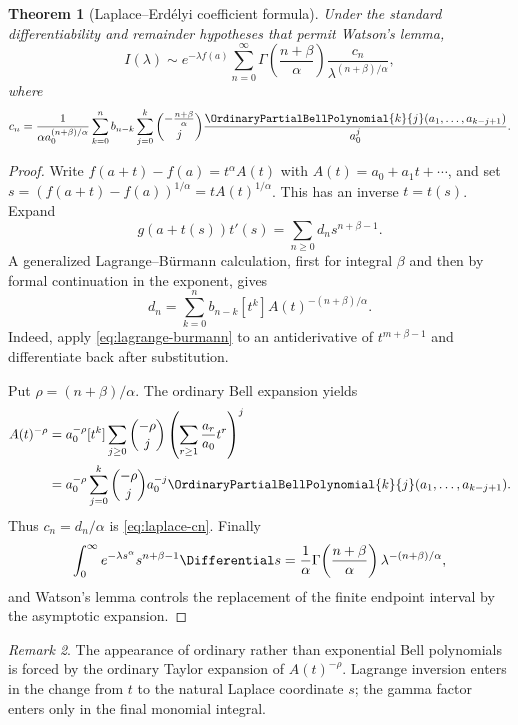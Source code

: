 \documentclass[11pt,a4paper,oneside,openany]{book}
\newtheorem{theorem}{Theorem}[chapter]
\theoremstyle{definition}
\theoremstyle{remark}
\newtheorem{remark}[theorem]{Remark}
\begin{document}
\begin{theorem}[Laplace--Erd\'elyi coefficient formula]
\label{thm:laplace-bell}
Under the standard differentiability and remainder hypotheses that permit Watson's
lemma,
\begin{equation}\label{eq:laplace-asymptotic}
 I(\lambda)\sim e^{-\lambda f(a)}
 \sum_{n=0}^{\infty}
 \Gamma\!\left(\frac{n+\beta}{\alpha}\right)
 \frac{c_n}{\lambda^{(n+\beta)/\alpha}},
\end{equation}
where
\begin{equation}\label{eq:laplace-cn}
 c_n=\frac1{\alpha a_0^{(n+\beta)/\alpha}}
 \sum_{k=0}^{n}b_{n-k}
 \sum_{j=0}^{k}
 \binom{-\frac{n+\beta}{\alpha}}{j}
 \frac{\OrdinaryPartialBellPolynomial{k}{j}(a_1,\ldots,a_{k-j+1})}{a_0^j}.
\end{equation}
\end{theorem}
\begin{proof}
Write
$f(a+t)-f(a)=t^\alpha A(t)$ with
$A(t)=a_0+a_1t+\cdots$, and set
$s=(f(a+t)-f(a))^{1/\alpha}=tA(t)^{1/\alpha}$.  This has an inverse $t=t(s)$.
Expand
\[
 g(a+t(s))t'(s)=\sum_{n\ge0}d_ns^{n+\beta-1}.
\]
A generalized Lagrange--Bürmann calculation, first for integral $\beta$ and then
by formal continuation in the exponent, gives
\[
 d_n=\sum_{k=0}^{n}b_{n-k}[t^k]A(t)^{-(n+\beta)/\alpha}.
\]
Indeed, apply \eqref{eq:lagrange-burmann} to an antiderivative of
$t^{m+\beta-1}$ and differentiate back after substitution.

Put $\rho=(n+\beta)/\alpha$.  The ordinary Bell expansion yields
\begin{align*}
 [t^k]A(t)^{-\rho}
 &=a_0^{-\rho}[t^k]
 \sum_{j\ge0}\binom{-\rho}{j}
 \left(\sum_{r\ge1}\frac{a_r}{a_0}t^r\right)^j\\
 &=a_0^{-\rho}\sum_{j=0}^{k}\binom{-\rho}{j}a_0^{-j}
 \OrdinaryPartialBellPolynomial{k}{j}(a_1,\ldots,a_{k-j+1}).
\end{align*}
Thus $c_n=d_n/\alpha$ is \eqref{eq:laplace-cn}.  Finally
\[
 \int_0^\infty e^{-\lambda s^\alpha}s^{n+\beta-1}\Differential s
 =\frac1\alpha\Gamma\!\left(\frac{n+\beta}{\alpha}\right)
 \lambda^{-(n+\beta)/\alpha},
\]
and Watson's lemma controls the replacement of the finite endpoint interval by
the asymptotic expansion.
\end{proof}

\begin{remark}
The appearance of ordinary rather than exponential Bell polynomials is forced by
the ordinary Taylor expansion of $A(t)^{-\rho}$.  Lagrange inversion enters in the
change from $t$ to the natural Laplace coordinate $s$; the gamma factor enters only
in the final monomial integral.
\end{remark}
\end{document}
